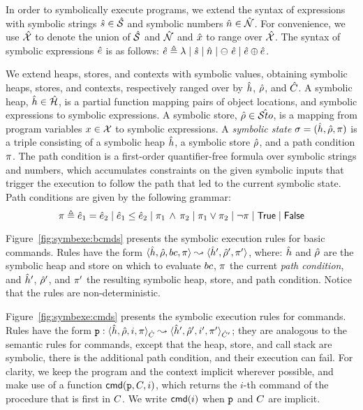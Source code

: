 In order to symbolically execute \jsil programs, we extend the syntax of \jsil expressions with 
symbolic strings $\hat{s} \in \hat{\mathcal{S}}$ and symbolic numbers $\hat{n} \in \hat{\mathcal{N}}$. 
For convenience, we use $\hat{\mathcal{X}}$ to denote the union of $\hat{\mathcal{S}}$ and $\hat{\mathcal{N}}$ 
and $\hat{x}$ to range over $\hat{\mathcal{X}}$. 
The syntax of symbolic expressions $\hat{e}$ is as follows: $\hat{e} \triangleq \lambda \mid \hat{s} \mid \hat{n} \mid \ominus\ \hat{e} \mid \hat{e} \oplus \hat{e}$.

We extend heaps, stores, and contexts with symbolic values, obtaining symbolic 
heaps, stores, and contexts, respectively ranged over by $\hat{h}$, $\hat\rho$, and $\hat{C}$. 
A symbolic heap, $\hat{h} \in \hat{\mathcal H}$, is a partial function mapping pairs of  
object locations, and symbolic expressions to symbolic expressions. 
A symbolic store, $\hat\rho \in \hat{{\mathcal S}to}$, is a mapping from program variables 
$x \in \mathcal{X}$ to symbolic expressions.
%
A \emph{symbolic state} $\sigma = (\hat{h}, \hat\rho, \pi)$ is a triple consisting of a 
symbolic heap $\hat{h}$, a symbolic store $\hat\rho$, and a path condition $\pi$. 
The path condition is a first-order quantifier-free formula over symbolic strings and 
numbers, which accumulates constraints on the given symbolic inputs that trigger 
the execution to follow the path that led to the current symbolic state. 
Path conditions are given by the following grammar: 
\begin{equation*}
\pi \triangleq \hat{e}_1 = \hat{e}_2 \mid \hat{e}_1 \leq \hat{e}_2 \mid \pi_1 \, \wedge \, \pi_2 \mid \pi_1 \vee \pi_2 \mid \neg \pi \mid \mathsf{True} \mid \mathsf{False}
\end{equation*}

Figure~\ref{fig:symbexe:bcmds} presents the symbolic execution rules for \jsil basic commands. 
Rules have the form $\symbtrans{\sheap, \sstore, \bcmd, \pc}{\sheap', \sstore', \pc'}$, 
where:  $\hat{h}$ and $\hat\rho$ are the symbolic heap and store on which to evaluate $bc$, 
 $\pi$ the current \emph{path condition}, and  $\hat{h}'$, $\hat\rho'$, and $\pi'$
the resulting symbolic heap, store, and path condition. Notice that the rules are non-deterministic.

Figure~\ref{fig:symbexe:cmds} presents the symbolic execution rules for \jsil commands. 
Rules have the form $\symbtrans[\prog]{\sheap, \sstore, i, \pc}{\sheap', \sstore', i', \pc'}[\sctx][\sctx']$; 
they are analogous to the semantic rules for \jsil commands, except that the heap, store, and call stack are symbolic, there is the additional path condition, and their execution can fail. For clarity, we keep the program and the context implicit wherever possible, and make use of a function $\ccmd{\prog, \ctx, i}$, which returns the $i$-th command of the procedure that is first in $C$. We write $\ccmd{i}$ when $\mathtt{p}$ and $C$ are implicit.

